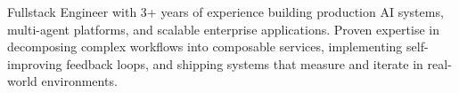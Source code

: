 \documentclass[letter,10pt]{article}
\begin{document}
Fullstack Engineer with 3+ years of experience building production AI systems, multi-agent platforms, and scalable enterprise applications. Proven expertise in decomposing complex workflows into composable services, implementing self-improving feedback loops, and shipping systems that measure and iterate in real-world environments.
\end{document}
